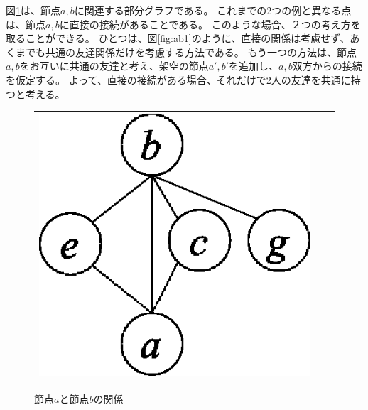 図\ref{fig:ab2}は、節点$a,b$に関連する部分グラフである。
これまでの2つの例と異なる点は、節点$a,b$に直接の接続があることである。
このような場合、２つの考え方を取ることができる。
ひとつは、図\ref{fig:ab1}のように、直接の関係は考慮せず、あくまでも共通の友達関係だけを考慮する方法である。
もう一つの方法は、節点$a,b$をお互いに共通の友達と考え、架空の節点$a',b'$を追加し、$a,b$双方からの接続を仮定する。
よって、直接の接続がある場合、それだけで2人の友達を共通に持つと考える。

\begin{figure}[htbp]
\begin{center}
\begin{tabular}{ccc}

\begin{minipage}{0.3\hsize}
\begin{center}
\includegraphics[scale=0.5]{./ab2.eps}
\caption{節点$a$と節点$b$の関係\label{fig:ab2}}
\end{center}
\end{minipage}


\end{tabular}
\end{center}
\end{figure}
